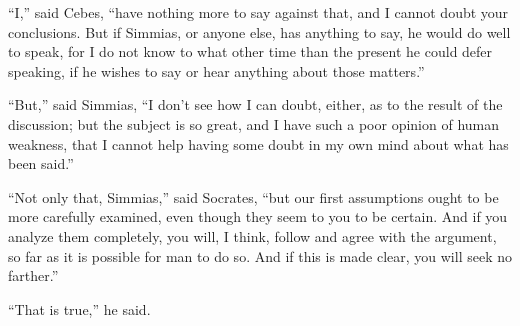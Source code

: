 \documentclass[letterpaper,12pt]{article}
\newcommand{\stephpag}[1]{\marginnote{\small\itshape\fontfamily{ppl}\selectfont #1}}
\begin{document}
\begin{drama}
``I,'' said Cebes, ``have nothing more to say against that, and I cannot doubt your conclusions. But if Simmias, or anyone else, has anything to say, he would do well to speak, for I do not know to what other time than the present he could defer speaking, if he wishes to say or hear anything about those matters.''
 
``But,'' said Simmias, ``I don't see how I can doubt, either, as to the result of the discussion; but the subject is so great, \stephpag{b} and I have such a poor opinion of human weakness, that I cannot help having some doubt in my own mind about what has been said.''
 
``Not only that, Simmias,'' said Socrates, ``but our first assumptions ought to be more carefully examined, even though they seem to you to be certain. And if you analyze them completely, you will, I think, follow and agree with the argument, so far as it is possible for man to do so. And if this is made clear, you will seek no farther.''
 
``That is true,'' he said.
 

\end{drama}
\end{document}
